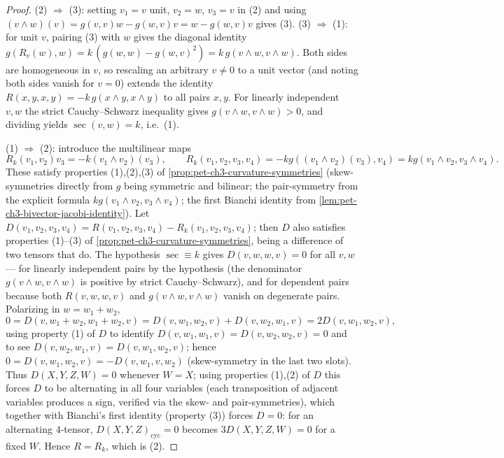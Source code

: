 \begin{proof}
  \leanok
  (2) $\Rightarrow$ (3): setting $v_1=v$ unit, $v_2=w$, $v_3=v$ in (2) and using
  $(v\wedge w)(v)=g(v,v)w-g(w,v)v=w-g(w,v)v$ gives (3). (3) $\Rightarrow$ (1):
  for unit $v$, pairing (3) with $w$ gives the diagonal identity
  $g(R_v(w),w)=k\,(g(w,w)-g(w,v)^2)=k\,g(v\wedge w,v\wedge w)$. Both sides
  are homogeneous in $v$, so rescaling an arbitrary $v\ne0$ to a unit vector
  (and noting both sides vanish for $v=0$) extends the identity
  $R(x,y,x,y)=-k\,g(x\wedge y,x\wedge y)$ to all pairs $x,y$. For linearly
  independent $v,w$ the strict Cauchy--Schwarz inequality gives
  $g(v\wedge w,v\wedge w)>0$, and dividing yields $\sec(v,w)=k$, i.e.\ (1).

  (1) $\Rightarrow$ (2): introduce the multilinear maps
  \[
    R_k(v_1,v_2)v_3=-k(v_1\wedge v_2)(v_3),\qquad
    R_k(v_1,v_2,v_3,v_4)=-kg((v_1\wedge v_2)(v_3),v_4)=kg(v_1\wedge v_2,v_3\wedge v_4).
  \]
  These satisfy properties (1),(2),(3) of \cref{prop:pet-ch3-curvature-symmetries}
  (skew-symmetries directly from $g$ being symmetric and bilinear; the
  pair-symmetry from the explicit formula $kg(v_1\wedge v_2,v_3\wedge v_4)$; the
  first Bianchi identity from \cref{lem:pet-ch3-bivector-jacobi-identity}). Let
  $D(v_1,v_2,v_3,v_4)=R(v_1,v_2,v_3,v_4)-R_k(v_1,v_2,v_3,v_4)$; then $D$ also
  satisfies properties (1)--(3) of \cref{prop:pet-ch3-curvature-symmetries}, being
  a difference of two tensors that do. The hypothesis $\sec\equiv k$ gives
  $D(v,w,w,v)=0$ for all $v,w$ --- for linearly independent pairs by the
  hypothesis (the denominator $g(v\wedge w,v\wedge w)$ is positive by strict
  Cauchy--Schwarz), and for dependent pairs because both $R(v,w,w,v)$ and
  $g(v\wedge w,v\wedge w)$ vanish on degenerate pairs. Polarizing in $w=w_1+w_2$,
  \[
    0=D(v,w_1+w_2,w_1+w_2,v)=D(v,w_1,w_2,v)+D(v,w_2,w_1,v)=2D(v,w_1,w_2,v),
  \]
  using property (1) of $D$ to identify $D(v,w_1,w_1,v)=D(v,w_2,w_2,v)=0$ and to
  see $D(v,w_2,w_1,v)=D(v,w_1,w_2,v)$; hence
  $0=D(v,w_1,w_2,v)=-D(v,w_1,v,w_2)$ (skew-symmetry in the last two slots). Thus
  $D(X,Y,Z,W)=0$ whenever $W=X$; using properties (1),(2) of $D$ this forces $D$
  to be alternating in all four variables (each transposition of adjacent
  variables produces a sign, verified via the skew- and pair-symmetries), which
  together with Bianchi's first identity (property (3)) forces $D=0$: for an
  alternating $4$-tensor, $D(X,Y,Z)_{\text{cyc}}=0$ becomes $3D(X,Y,Z,W)=0$ for a
  fixed $W$. Hence $R=R_k$, which is (2).


\end{proof}
